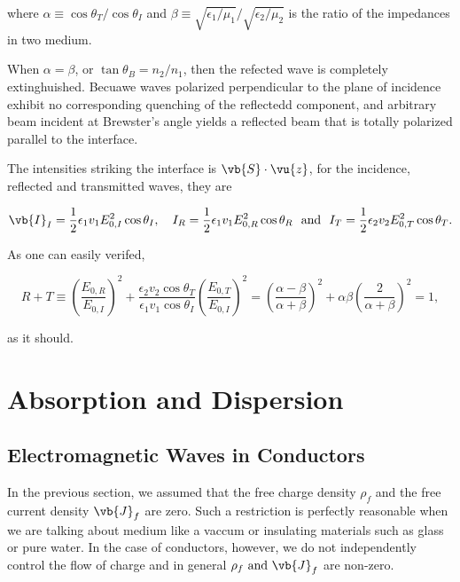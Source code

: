 \documentclass[english,a4paper,12pt]{report}
\begin{document}
where \(\alpha \equiv \cos \theta _{T} /\cos \theta _{I}  \) and \(\beta \equiv \sqrt{\epsilon _{1}/\mu _{1}  } /\sqrt{\epsilon _{2} /\mu _{2} }  \) is the ratio of the impedances in two medium.  

When \(\alpha = \beta \), or \(\tan \theta _{B} = n_2 /n_1  \), then the refected wave is completely extinghuished. Becuawe waves polarized perpendicular to the plane of incidence exhibit no corresponding quenching of the reflectedd component, and arbitrary beam incident at Brewster's angle yields a reflected beam that is totally polarized parallel to the interface.

The intensities striking the interface is \(\vb{S} \cdot \vu{z} \), for the incidence, reflected and transmitted waves, they are 

\begin{equation}
    \vb{I} _{I} = \frac{1}{2}\epsilon _{1}v_{1}E_{0,I}^2\cos \theta _{I}, \quad I_{R} = \frac{1}{2}\epsilon _{1}v_{1}E_{0,R}^2\cos \theta _{R} ~\text { and }~ I_{T} = \frac{1}{2}\epsilon _{2}v_{2}E_{0,T}^2\cos \theta _{T}.                  
\end{equation}

As one can easily verifed, 

\begin{equation}
    R + T \equiv \left( \frac{E_{0,R} }{E_{0,I} }  \right)^2 + \frac{\epsilon _{2}v_{2}\cos \theta _{T}   }{\epsilon _{1}v_{1}\cos \theta _{I}   }\left( \frac{E_{0,T} }{E_{0,I} }  \right)^2 = \left( \frac{\alpha -\beta }{\alpha +\beta }  \right)^2 + \alpha \beta \left( \frac{2}{\alpha +\beta }  \right)^2 = 1, 
\end{equation}

as it should.

\section{Absorption and Dispersion}

\subsection{Electromagnetic Waves in Conductors}

In the previous section, we assumed that the free charge density \(\rho _{f} \) and the free current density \(\vb{J} _{f} \) are zero. Such a restriction is perfectly reasonable when we are talking about medium like a vaccum or insulating materials such as glass or pure water. In the case of conductors, however, we do not independently control the flow of charge and in general \(\rho _{f} \text { and }  \vb{J} _{f}  \) are non-zero. 
\end{document}
